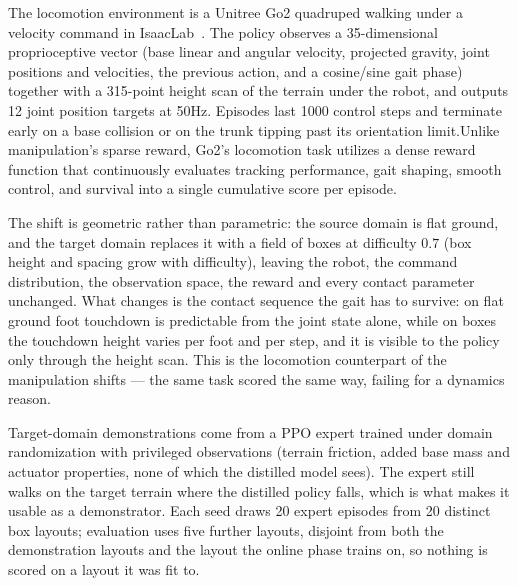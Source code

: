 \documentclass{article} %
\begin{document}
The locomotion environment is a Unitree Go2 quadruped walking under a velocity command in IsaacLab~\citep{NVIDIA_Isaac_Sim}. The policy observes a 35-dimensional proprioceptive vector (base linear and angular velocity, projected gravity, joint positions and velocities, the previous action, and a cosine/sine gait phase) together with a 315-point height scan of the terrain under the robot, and outputs 12 joint position targets at 50Hz. Episodes last 1000 control steps and terminate early on a base collision or on the trunk tipping past its orientation limit.Unlike manipulation's sparse reward, Go2's locomotion task utilizes a dense reward function that continuously evaluates tracking performance, gait shaping, smooth control, and survival into a single cumulative score per episode.

 The shift is geometric rather than parametric: the source domain is flat ground, and the target domain replaces it with a field of boxes at difficulty $0.7$ (box height and spacing grow with difficulty), leaving the robot, the command distribution, the observation space, the reward and every contact parameter unchanged. What changes is the contact sequence the gait has to survive: on flat ground foot touchdown is predictable from the joint state alone, while on boxes the touchdown height varies per foot and per step, and it is visible to the policy only through the height scan. This is the locomotion counterpart of the manipulation shifts --- the same task scored the same way, failing for a dynamics reason.

Target-domain demonstrations come from a PPO expert trained under domain
randomization with privileged observations (terrain friction, added base mass and actuator properties, none of which the distilled model sees). The expert still walks on the target terrain where the distilled policy falls, which is what makes it usable as a demonstrator. Each seed draws 20 expert episodes from 20 distinct box layouts; evaluation uses five further layouts, disjoint from both the demonstration layouts and the layout the online phase trains on, so nothing is scored on a layout it was fit to.
\end{document}
